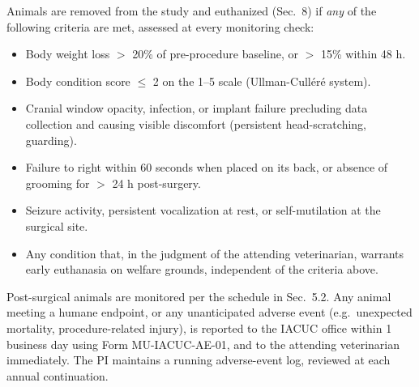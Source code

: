 \vspace{8pt}

Animals are removed from the study and euthanized (Sec.\ 8) if \emph{any} of the following
criteria are met, assessed at every monitoring check:

\begin{itemize}
  \item Body weight loss $>$ 20\% of pre-procedure baseline, or $>$ 15\% within 48 h.
  \item Body condition score $\leq$ 2 on the 1--5 scale (Ullman-Cull\'{e}r\'{e} system).
  \item Cranial window opacity, infection, or implant failure precluding data collection and
    causing visible discomfort (persistent head-scratching, guarding).
  \item Failure to right within 60 seconds when placed on its back, or absence of grooming for
    $>$ 24 h post-surgery.
  \item Seizure activity, persistent vocalization at rest, or self-mutilation at the surgical
    site.
  \item Any condition that, in the judgment of the attending veterinarian, warrants early
    euthanasia on welfare grounds, independent of the criteria above.
\end{itemize}

\vspace{6pt}

Post-surgical animals are monitored per the schedule in Sec.\ 5.2. Any animal meeting a humane
endpoint, or any unanticipated adverse event (e.g.\ unexpected mortality, procedure-related
injury), is reported to the IACUC office within 1 business day using Form MU-IACUC-AE-01, and
to the attending veterinarian immediately. The PI maintains a running adverse-event log,
reviewed at each annual continuation.
